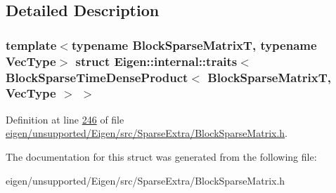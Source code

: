 \subsection{Detailed Description}
\subsubsection*{template$<$typename Block\+Sparse\+MatrixT, typename Vec\+Type$>$\newline
struct Eigen\+::internal\+::traits$<$ Block\+Sparse\+Time\+Dense\+Product$<$ Block\+Sparse\+Matrix\+T, Vec\+Type $>$ $>$}



Definition at line \hyperlink{eigen_2unsupported_2_eigen_2src_2_sparse_extra_2_block_sparse_matrix_8h_source_l00246}{246} of file \hyperlink{eigen_2unsupported_2_eigen_2src_2_sparse_extra_2_block_sparse_matrix_8h_source}{eigen/unsupported/\+Eigen/src/\+Sparse\+Extra/\+Block\+Sparse\+Matrix.\+h}.



The documentation for this struct was generated from the following file\+:\begin{DoxyCompactItemize}
\item 
eigen/unsupported/\+Eigen/src/\+Sparse\+Extra/\+Block\+Sparse\+Matrix.\+h\end{DoxyCompactItemize}

